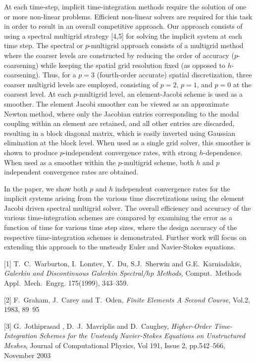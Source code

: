 \documentclass[twosided]{report}
\begin{document}
At each time-step, implicit time-integration methods require the
solution of one or more non-linear problems. Efficient non-linear
solvers are required for this task in order to result in an overall
competitive approach. Our approach consists of using a spectral
multigrid strategy [4,5] for solving the implicit system at each time
step. The spectral or $p$-multigrid approach consists of a multigrid
method where the coarser levels are constructed by reducing the order
of accuracy ($p$-coarsening) while keeping the spatial grid resolution
fixed (as opposed to $h$-coarsening). Thus, for a
$p=3$ (fourth-order
accurate) spatial discretization, three coarser multigrid levels are
employed, consisting of $p=2$, $p=1$, and $p=0$ at the coarsest level. At
each $p$-multigrid level, an element-Jacobi scheme is used as a smoother.
The element Jacobi smoother can be viewed as an approximate Newton
method, where only the Jacobian entries corresponding to the modal
coupling within an element are retained, and all other entries are
discarded, resulting in a block diagonal matrix, which is easily
inverted using Gaussian elimination at the block level. When used as a
single grid solver, this smoother is shown to produce $p$-independent
convergence rates, with strong $h$-dependence. When used as a smoother
within the $p$-multigrid scheme, both $h$ and $p$ independent convergence
rates are obtained.

In the paper, we show both $p$ and $h$ independent convergence rates for
the implicit systems arising from the various time discretizations
using the element Jacobi driven spectral multigrid solver. The overall
efficiency and accuracy of the various time-integration schemes are
compared by examining the error as a function of time for various time
step sizes, where the design accuracy of the respective
time-integration schemes is demonstrated. Further work will focus on
extending this approach to the unsteady Euler and Navier-Stokes
equations.


[1] T.~C.~Warburton, I.~Lomtev, Y.~Du, S.J.~Sherwin and
G.E.~Karniadakis,
{\em Galerkin and Discontinuous Galerkin Spectral/$hp$ Methods},
Comput.~Methods Appl.~Mech.~Engrg. 175(1999), 343--359.

[2] F.~Graham, J.~Carey and T.~Oden,
{\em Finite Elements A Second Course},
Vol.2, 1983, 89~95

[3] G.~Jothiprasad , D.~J.~Mavriplis and D.~Caughey,
{\em Higher-Order
Time-Integration Schemes for the Unsteady Navier-Stokes Equations on
Unstructured Meshes}, Journal of Computational Physics, Vol 191, Issue
2, pp.542--566, November 2003
\end{document}
